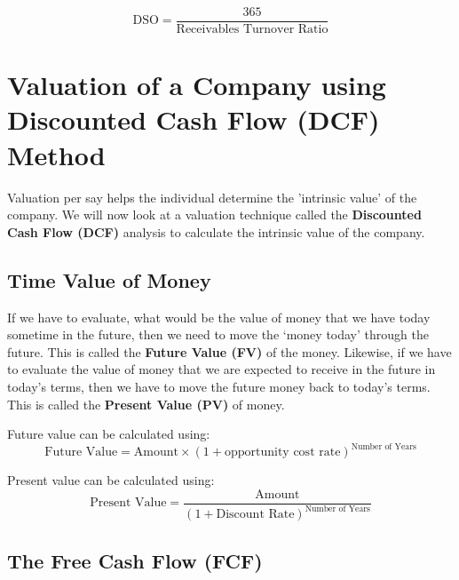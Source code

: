 \begin{displaymath}
  \textrm{DSO} = \frac{365}{\textrm{Receivables Turnover Ratio}}
\end{displaymath}

\section{Valuation of a Company using Discounted Cash Flow (DCF) Method}
Valuation per say helps the individual determine the 'intrinsic value' of the company. We will now look at a valuation technique called the \textbf{Discounted Cash Flow (DCF)} analysis to calculate the intrinsic value of the company.

\subsection{Time Value of Money}
If we have to evaluate, what would be the value of money that we have today sometime in the future, then we need to move the ‘money today’ through the future. This is called the \textbf{Future Value (FV)} of the money. Likewise, if we have to evaluate the value of money that we are expected to receive in the future in today’s terms, then we have to move the future money back to today’s terms. This is called the \textbf{Present Value (PV)} of money.


Future value can be calculated using:
\begin{displaymath}
  \textrm{Future Value} = \textrm{Amount} \times (1 + \textrm{opportunity cost rate})^\textrm{Number of Years}
\end{displaymath}

Present value can be calculated using:
\begin{displaymath}
  \textrm{Present Value} = \frac{\textrm{Amount}}{(1 + \textrm{Discount Rate})^\textrm{Number of Years}}
\end{displaymath}


\subsection{The Free Cash Flow (FCF)}

